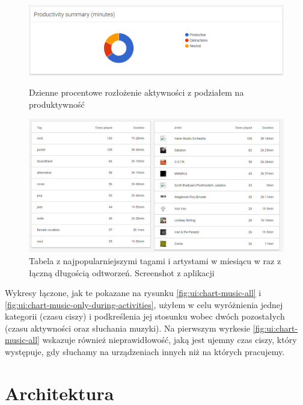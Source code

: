 \documentclass[openright]{xmgr}
\begin{document}

    \begin{figure}

        \includegraphics[width=\linewidth]{fig/ui/chart-productivity-summary.png}
        \caption{Dzienne procentowe rozłożenie aktywności z podziałem na produktywność}
        \label{fig:ui:chart-productivity-summary}

        \includegraphics[width=\linewidth]{fig/ui/table-popular-music-tags.png}
        \caption{Tabela z najpopularniejszymi tagami i artystami w miesiącu w raz z łączną długością odtworzeń. Screenshot z aplikacji}
        \label{fig:ui:table-popular-music-tags}
    \end{figure}

    Wykresy łączone, jak te pokazane na rysunku \ref{fig:ui:chart-music-all} i \ref{fig:ui:chart-music-only-during-activities},
    użyłem w celu wyróżnienia jednej kategorii (czasu ciszy) i podkreślenia jej stosunku wobec dwóch pozostałych (czasu aktywności oraz słuchania muzyki).
    Na pierwszym wyrkesie \ref{fig:ui:chart-music-all} wskazuje również nieprawidłowość, jaką jest ujemny czas ciszy,
    który występuje, gdy słuchamy na urządzeniach innych niż na których pracujemy.

\chapter{Architektura}
\end{document}

